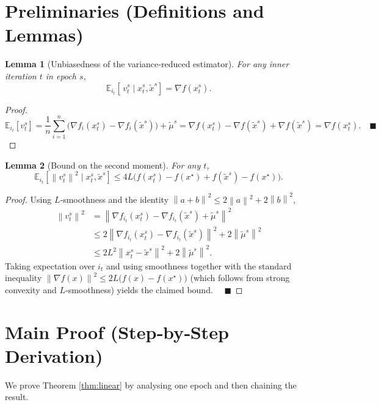 \documentclass[11pt]{article}
\newtheorem{lemma}{Lemma}
\newcommand{\E}{\mathbb{E}}
\newcommand{\norm}[1]{\left\|#1\right\|}
\newcommand{\grad}{\nabla}
\begin{document}
\section*{Preliminaries (Definitions and Lemmas)}
\begin{lemma}[Unbiasedness of the variance‑reduced estimator]\label{lem:unbiased}
For any inner iteration $t$ in epoch $s$,
\[
\E_{i_t}\!\left[\,v_t^{s}\mid x_t^{s},\tilde{x}^{s}\right]=\grad f(x_t^{s}).
\]
\end{lemma}
\begin{proof}
\[
\E_{i_t}[v_t^{s}]
= \frac1n\sum_{i=1}^{n}\bigl(\grad f_i(x_t^{s})-\grad f_i(\tilde{x}^{s})\bigr)+\tilde{\mu}^{s}
= \grad f(x_t^{s})-\grad f(\tilde{x}^{s})+\grad f(\tilde{x}^{s})
= \grad f(x_t^{s}).\quad\blacksquare
\]
\end{proof}
\begin{lemma}[Bound on the second moment]\label{lem:second}
For any $t$,
\[
\E_{i_t}\!\left[\norm{v_t^{s}}^{2}\mid x_t^{s},\tilde{x}^{s}\right]
\le 4L\bigl(f(x_t^{s})-f(x^{\star})+f(\tilde{x}^{s})-f(x^{\star})\bigr).
\]
\end{lemma}
\begin{proof}
Using $L$‑smoothness and the identity
$\norm{a+b}^{2}\le 2\norm{a}^{2}+2\norm{b}^{2}$,
\[
\begin{aligned}
\norm{v_t^{s}}^{2}
&=\norm{\grad f_{i_t}(x_t^{s})-\grad f_{i_t}(\tilde{x}^{s})+\tilde{\mu}^{s}}^{2}\\
&\le 2\norm{\grad f_{i_t}(x_t^{s})-\grad f_{i_t}(\tilde{x}^{s})}^{2}
     +2\norm{\tilde{\mu}^{s}}^{2}\\
&\le 2L^{2}\norm{x_t^{s}-\tilde{x}^{s}}^{2}+2\norm{\tilde{\mu}^{s}}^{2}.
\end{aligned}
\]
Taking expectation over $i_t$ and using smoothness together with the standard inequality
$ \norm{\grad f(x)}^{2}\le 2L\bigl(f(x)-f(x^{\star})\bigr)$ (which follows from strong convexity and $L$‑smoothness) yields the claimed bound. $\quad\blacksquare$
\end{proof}

\section*{Main Proof (Step‑by‑Step Derivation)}
We prove Theorem \ref{thm:linear} by analysing one epoch and then chaining the result.
\end{document}
